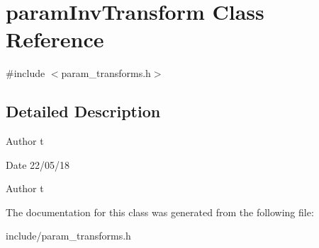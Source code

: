 \hypertarget{classparamInvTransform}{}\section{param\+Inv\+Transform Class Reference}
\label{classparamInvTransform}


{\ttfamily \#include $<$param\+\_\+transforms.\+h$>$}



\subsection{Detailed Description}
\begin{DoxyAuthor}{Author}
t 
\end{DoxyAuthor}
\begin{DoxyDate}{Date}
22/05/18
\end{DoxyDate}
\begin{DoxyAuthor}{Author}
t 
\end{DoxyAuthor}


The documentation for this class was generated from the following file\+:\begin{DoxyCompactItemize}
\item 
include/param\+\_\+transforms.\+h\end{DoxyCompactItemize}
